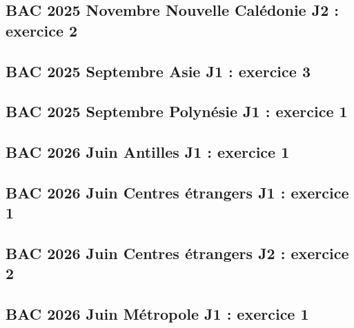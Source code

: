 \documentclass[lang=fr,edition=teacher,layout=sheet]{mxbook}
\begin{document}
\begingroup\endgroup
\par\bigskip
{}\subsection*{BAC 2025 Novembre Nouvelle Calédonie J2 : exercice 2}
\begingroup\endgroup
\par\bigskip
{}\subsection*{BAC 2025 Septembre Asie J1 : exercice 3}
\begingroup\endgroup
\par\bigskip
{}\subsection*{BAC 2025 Septembre Polynésie J1 : exercice 1}
\begingroup\endgroup
\par\bigskip
{}\subsection*{BAC 2026 Juin Antilles J1 : exercice 1}
\begingroup\endgroup
\par\bigskip
{}\subsection*{BAC 2026 Juin Centres étrangers J1 : exercice 1}
\begingroup\endgroup
\par\bigskip
{}\subsection*{BAC 2026 Juin Centres étrangers J2 : exercice 2}
\begingroup\endgroup
\par\bigskip
{}\subsection*{BAC 2026 Juin Métropole J1 : exercice 1}
\end{document}
